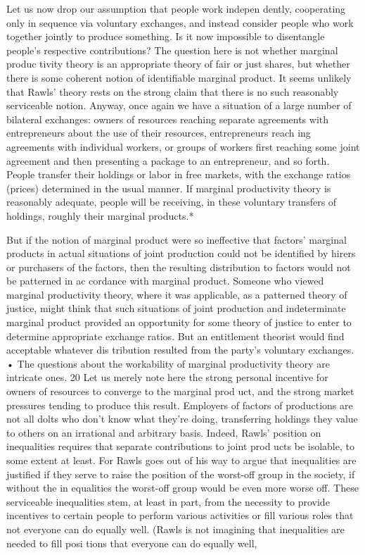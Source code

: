 \documentclass[11pt,openany]{book}
\begin{document}
Let us now drop our assumption that people work indepen dently, cooperating only in sequence via voluntary exchanges, and instead consider people who work together jointly to produce something. Is it now impossible to disentangle people's respective contributions? The question here is not whether marginal produc tivity theory is an appropriate theory of fair or just shares, but whether there is some coherent notion of identifiable marginal product. It seems unlikely that Rawls' theory rests on the strong claim that there is no such reasonably serviceable notion. Anyway, once again we have a situation of a large number of bilateral exchanges: owners of resources reaching separate agreements with entrepreneurs about the use of their resources, entrepreneurs reach ing agreements with individual workers, or groups of workers first reaching some joint agreement and then presenting a package to an entrepreneur, and so forth. People transfer their holdings or labor in free markets, with the exchange ratios (prices) determined in the usual manner. If marginal productivity theory is reasonably adequate, people will be receiving, in these voluntary transfers of holdings, roughly their marginal products.* 

But if the notion of marginal product were so ineffective that factors' marginal products in actual situations of joint production could not be identified by hirers or purchasers of the factors, then the resulting distribution to factors would not be patterned in ac cordance with marginal product. Someone who viewed marginal productivity theory, where it was applicable, as a patterned theory of justice, might think that such situations of joint production and indeterminate marginal product provided an opportunity for some theory of justice to enter to determine appropriate exchange ratios. But an entitlement theorist would find acceptable whatever dis tribution resulted from the party's voluntary exchanges. • The questions about the workability of marginal productivity theory are intricate ones. 20 Let us merely note here the strong personal incentive for owners of resources to converge to the marginal prod uct, and the strong market pressures tending to produce this result. Employers of factors of productions are not all dolts who don't know what they're doing, transferring holdings they value to others on an irrational and arbitrary basis. Indeed, Rawls' position on inequalities requires that separate contributions to joint prod ucts be isolable, to some extent at least. For Rawls goes out of his way to argue that inequalities are justified if they serve to raise the position of the worst-off group in the society, if without the in equalities the worst-off group would be even more worse off. These serviceable inequalities stem, at least in part, from the necessity to provide incentives to certain people to perform various activities or fill various roles that not everyone can do equally well. (Rawls is not imagining that inequalities are needed to fill posi tions that everyone can do equally well, 
\end{document}
